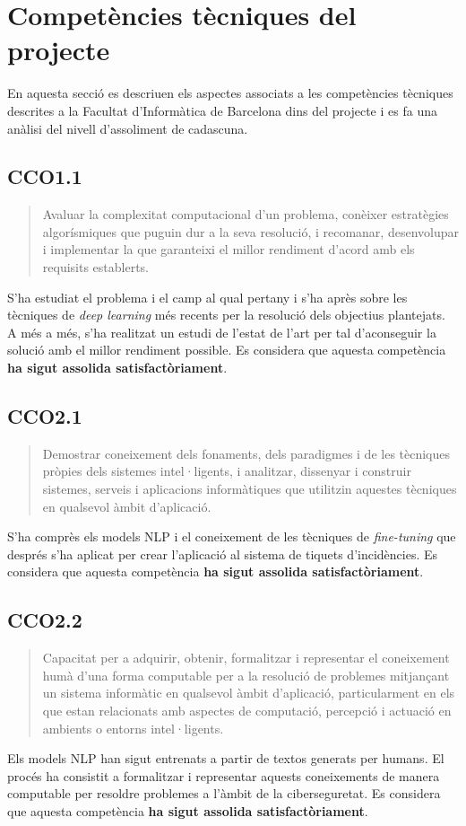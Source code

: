 \section{Competències tècniques del projecte}
En aquesta secció es descriuen els aspectes associats a les competències tècniques descrites a la Facultat d'Informàtica de Barcelona dins del projecte i es fa una anàlisi del nivell d'assoliment de cadascuna.

\subsection*{CCO1.1}
\begin{quote}
    Avaluar la complexitat computacional d'un problema, conèixer estratègies algorísmiques que puguin dur a la seva resolució, i recomanar, desenvolupar i implementar la que garanteixi el millor rendiment d'acord amb els requisits establerts.
\end{quote}
S'ha estudiat el problema i el camp al qual pertany i s'ha après sobre les tècniques de \textit{deep learning} més recents per la resolució dels objectius plantejats. A més a més, s'ha realitzat un estudi de l'estat de l'art per tal d'aconseguir la solució amb el millor rendiment possible. Es considera que aquesta competència \textbf{ha sigut assolida satisfactòriament}.

\subsection*{CCO2.1}
\begin{quote}
    Demostrar coneixement dels fonaments, dels paradigmes i de les tècniques pròpies dels sistemes intel·ligents, i analitzar, dissenyar i construir sistemes, serveis i aplicacions informàtiques que utilitzin aquestes tècniques en qualsevol àmbit d'aplicació.
\end{quote}
S'ha comprès els models NLP i el coneixement de les tècniques de \textit{fine-tuning} que després s'ha aplicat per crear l'aplicació al sistema de tiquets d'incidències. Es considera que aquesta competència \textbf{ha sigut assolida satisfactòriament}.

\subsection*{CCO2.2}
\begin{quote}
    Capacitat per a adquirir, obtenir, formalitzar i representar el coneixement humà d'una forma computable per a la resolució de problemes mitjançant un sistema informàtic en qualsevol àmbit d'aplicació, particularment en els que estan relacionats amb aspectes de computació, percepció i actuació en ambients o entorns intel·ligents.
\end{quote}
Els models NLP han sigut entrenats a partir de textos generats per humans. El procés ha consistit a formalitzar i representar aquests coneixements de manera computable per resoldre problemes a l'àmbit de la ciberseguretat. Es considera que aquesta competència \textbf{ha sigut assolida satisfactòriament}.

